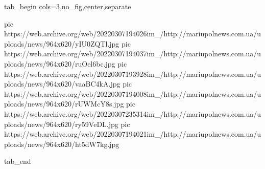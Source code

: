  
 
 
 
 

\ifcmt
  tab_begin cols=3,no_fig,center,separate

     pic https://web.archive.org/web/20220307194026im_/http://mariupolnews.com.ua/uploads/news/964x620/yIU0ZQTl.jpg
		 pic https://web.archive.org/web/20220307194037im_/http://mariupolnews.com.ua/uploads/news/964x620/ruOel6bc.jpg
		 pic https://web.archive.org/web/20220307193928im_/http://mariupolnews.com.ua/uploads/news/964x620/vaaBC4kA.jpg
		 pic https://web.archive.org/web/20220307194008im_/http://mariupolnews.com.ua/uploads/news/964x620/rUWMcY8s.jpg
		 pic https://web.archive.org/web/20220307235314im_/http://mariupolnews.com.ua/uploads/news/964x620/ry59VeDL.jpg
		 pic https://web.archive.org/web/20220307194021im_/http://mariupolnews.com.ua/uploads/news/964x620/ht5dW7kg.jpg

  tab_end
\fi

